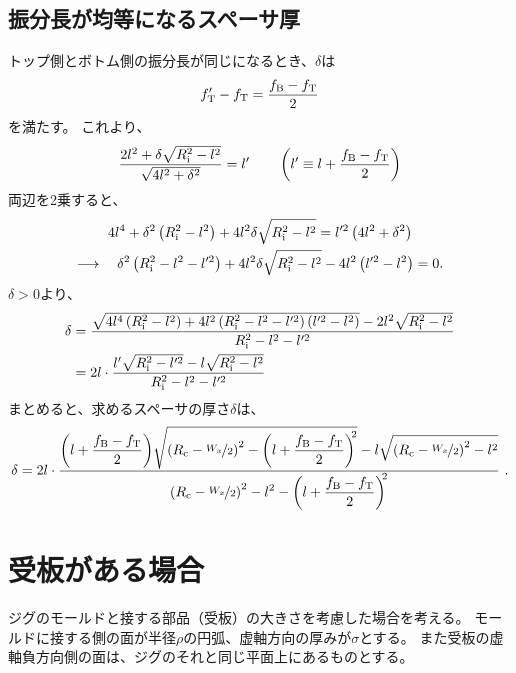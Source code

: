 \subsection{振分長が均等になるスペーサ厚}
トップ側とボトム側の振分長が同じになるとき、$\delta$は
\begin{align*}
  f'_\text T - f_\text T = \frac{f_\text B - f_\text T}2
\end{align*}
を満たす。
これより、
\begin{align*}
  \frac{2l^2+\delta\sqrt{R_\text i^2-l^2}}{\sqrt{4l^2+\delta^2}} = l'\qquad
  \left(l' \equiv l + \frac{f_\text B-f_\text T}2\right)
\end{align*}
両辺を2乗すると、
\begin{gather*}
  4l^4+\delta^2\left(R_\text i^2-l^2\right)+4l^2\delta\sqrt{R_\text i^2-l^2}
  = l'^2\left(4l^2+\delta^2\right)\\
  \longrightarrow\quad
  \delta^2\left(R_\text i^2-l^2-l'^2\right)+4l^2\delta\sqrt{R_\text i^2-l^2} - 4l^2\left(l'^2 - l^2\right)
  = 0.
\end{gather*}
$\delta > 0$より、
\begin{align*}
  \delta
  &= \frac{\sqrt{4l^4\left(R_\text i^2-l^2\right) +4l^2\left(R_\text i^2-l^2-l'^2\right)\left(l'^2 - l^2\right)}-2l^2\sqrt{R_\text i^2-l^2}}{R_\text i^2-l^2-l'^2}\\
  &= 2l\cdot\frac{l'\sqrt{R_\text i^2-l'^2}-l\sqrt{R_\text i^2-l^2}}{R_\text i^2-l^2-l'^2}
\end{align*}
まとめると、求めるスペーサの厚さ$\delta$は、
\begin{align*}
  \delta
  = 2l\cdot
    \frac{\displaystyle
          \left(l+\frac{f_\text B-f_\text T}2\right)\!
          \sqrt{\left(R_\text c-\nicefrac{W_x}2\right)^2-\left(l+\frac{f_\text B-f_\text T}2\right)^{\!\!2}}
          -l\sqrt{\left(R_\text c-\nicefrac{W_x}2\right)^2-l^2}}
         {\displaystyle\left(R_\text c-\nicefrac{W_x}2\right)^2-l^2-\left(l+\frac{f_\text B-f_\text T}2\right)^{\!\!2}}~.
\end{align*}




\clearpage
\section{受板がある場合}
ジグのモールドと接する部品（受板）の大きさを考慮した場合を考える。
モールドに接する側の面が半径$\rho$の円弧、虚軸方向の厚みが$\sigma$とする。
また受板の虚軸負方向側の面は、ジグのそれと同じ平面上にあるものとする。

